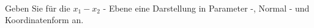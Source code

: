\begin{aufgabe} ~ \\ 
Geben Sie für die $x_1-x_2$ - Ebene eine Darstellung in Parameter -, Normal - und Koordinatenform an.\end{aufgabe} 
